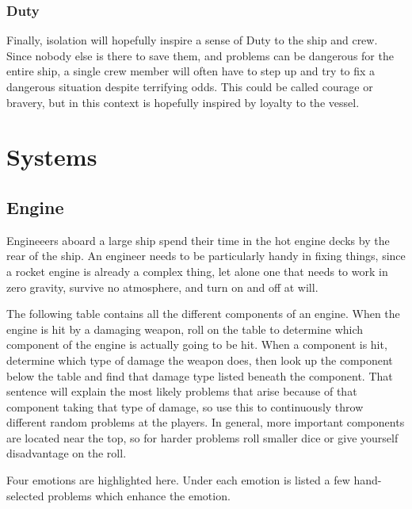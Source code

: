 \documentclass[a4paper]{article}
\begin{document}
\subsubsection{Duty} \label{duty}

Finally, isolation will hopefully inspire a sense of Duty to the ship and crew. Since nobody else is there to save them, and problems can be dangerous for the entire ship, a single crew member will often have to step up and try to fix a dangerous situation despite terrifying odds. This could be called courage or bravery, but in this context is hopefully inspired by loyalty to the vessel.


\newpage
\section{Systems} \label{systems}

\subsection{Engine} \label{engine}

Engineeers aboard a large ship spend their time in the hot engine decks by the rear of the ship. An engineer needs to be particularly handy in fixing things, since a rocket engine is already a complex thing, let alone one that needs to work in zero gravity, survive no atmosphere, and turn on and off at will.

The following table contains all the different components of an engine. When the engine is hit by a damaging weapon, roll on the table to determine which component of the engine is actually going to be hit. When a component is hit, determine which type of damage the weapon does, then look up the component below the table and find that damage type listed beneath the component. That sentence will explain the most likely problems that arise because of that component taking that type of damage, so use this to continuously throw different random problems at the players. In general, more important components are located near the top, so for harder problems roll smaller dice or give yourself disadvantage on the roll.

Four emotions are highlighted here. Under each emotion is listed a few hand-selected problems which enhance the emotion.
\end{document}
